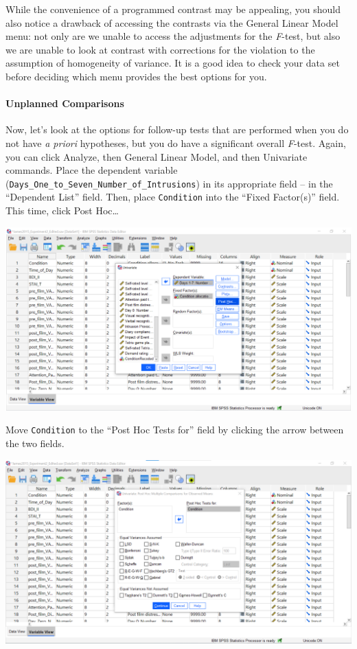\documentclass[
]{book}
\begin{document}
While the convenience of a programmed contrast may be appealing, you should also notice a drawback of accessing the contrasts via the {General Linear Model} menu: not only are we unable to access the adjustments for the \emph{F}-test, but also we are unable to look at contrast with corrections for the violation to the assumption of homogeneity of variance. It is a good idea to check your data set before deciding which menu provides the best options for you.

\hypertarget{unplanned-comparisons}{%
\paragraph{Unplanned Comparisons}\label{unplanned-comparisons}}

Now, let's look at the options for follow-up tests that are performed when you do not have \emph{a priori} hypotheses, but you do have a significant overall \emph{F}-test. Again, you can click {Analyze}, then {General Linear Model}, and then {Univariate} commands. Place the dependent variable (\texttt{Days\_One\_to\_Seven\_Number\_of\_Intrusions}) in its appropriate field -- in the ``Dependent List'' field. Then, place \texttt{Condition} into the ``Fixed Factor(s)'' field. This time, click {Post Hoc\ldots{}}

\includegraphics{img/8.6.6.48.png}

Move \texttt{Condition} to the ``Post Hoc Tests for'' field by clicking the arrow between the two fields.

\includegraphics{img/8.6.6.49.png}
\end{document}
